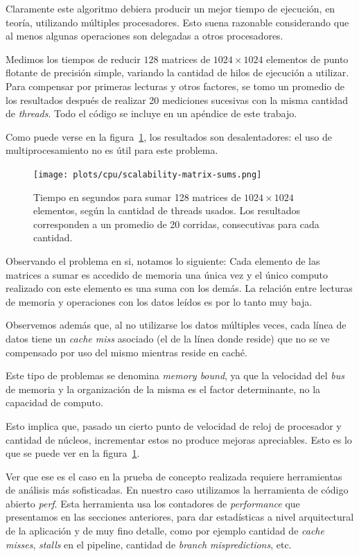 Claramente este algoritmo debiera producir un mejor tiempo de ejecuci\'on, en
teor\'ia, utilizando m\'ultiples procesadores. Esto suena razonable considerando
que al menos algunas operaciones son delegadas a otros procesadores.

Medimos los tiempos de reducir $128$ matrices de $1024 \times 1024$ elementos de punto
flotante de precisi\'on simple, variando la cantidad de hilos de ejecuci\'on a
utilizar. Para compensar por primeras lecturas y otros factores, se tomo un promedio
de los resultados despu\'es de realizar 20 mediciones sucesivas con la misma
cantidad de \textit{threads}. Todo el c\'odigo se incluye en un ap\'endice de este
trabajo.

Como puede verse en la figura~\ref{fig:sum-matrix-bench-result}, los resultados
son desalentadores: el uso de multiprocesamiento no es \'util para este problema.

\begin{figure}[htbp]
   \centering
   \texttt{[image: plots/cpu/scalability-matrix-sums.png]}
   \caption{Tiempo en segundos para sumar 128 matrices de $1024 \times 1024$
   elementos, seg\'un la cantidad de threads usados. Los resultados corresponden
   a un promedio de 20 corridas, consecutivas para cada cantidad.}
   \label{fig:sum-matrix-bench-result}
\end{figure}

Observando el problema en si, notamos lo siguiente: Cada elemento de las
matrices a sumar es accedido de memoria una \'unica vez y el \'unico computo
realizado con este elemento es una suma con los dem\'as. La relaci\'on entre
lecturas de memoria y operaciones con los datos le\'idos es por lo tanto muy baja.

Observemos adem\'as que, al no utilizarse los datos m\'ultiples veces, cada l\'inea
de datos tiene un \textit{cache miss} asociado (el de la l\'inea donde reside) que
no se ve compensado por uso del mismo mientras reside en cach\'e.

Este tipo de problemas se denomina \textit{memory bound}, ya que la velocidad del
\textit{bus} de memoria y la organizaci\'on de la misma es el factor determinante,
no la capacidad de computo.

Esto implica que, pasado un cierto punto de velocidad de reloj de procesador y
cantidad de n\'ucleos, incrementar estos no produce mejoras apreciables. Esto es
lo que se puede ver en la figura~\ref{fig:sum-matrix-bench-result}.

Ver que ese es el caso en la prueba de concepto realizada requiere herramientas
de an\'alisis m\'as sofisticadas. En nuestro caso utilizamos la herramienta de
c\'odigo abierto \textit{perf}. Esta herramienta usa los contadores de
\textit{performance} que presentamos en las secciones anteriores, para dar estad\'isticas
a nivel arquitectural de la aplicaci\'on y de muy fino detalle, como por
ejemplo cantidad de \textit{cache misses}, \textit{stalls} en el pipeline,
cantidad de \textit{branch mispredictions}, etc.

